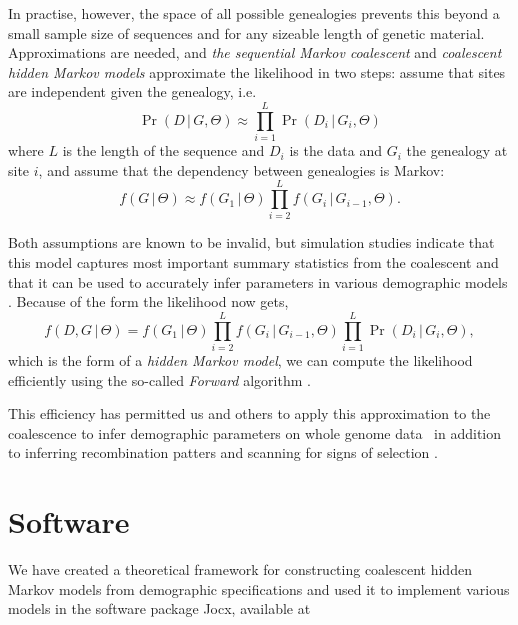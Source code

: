 \documentclass[graybox]{svmult}
\begin{document}
In practise, however, the space of all possible genealogies prevents this beyond a small sample size of sequences and for any sizeable length of genetic material. Approximations are needed, and \emph{the sequential Markov coalescent} and \emph{coalescent hidden Markov models} approximate the likelihood in two steps: assume that sites are independent given the genealogy, i.e.
\begin{equation}
  \Pr(D\,|\,G,\Theta) \approx
  \prod_{i=1}^L \Pr(D_i\,|\,G_i,\Theta)
\end{equation}
where $L$ is the length of the sequence and $D_i$ is the data and $G_i$ the genealogy at site $i$, and assume that the dependency between genealogies is Markov:
\begin{equation}
  \label{eq:markov-genealogy}
  f(G\,|\,\Theta) \approx
  f(G_1\,|\,\Theta)\prod_{i=2}^{L}f(G_{i}\,|\,G_{i-1},\Theta)
  .
\end{equation}

Both assumptions are known to be invalid, but simulation studies indicate that this model captures most important summary statistics from the coalescent \cite{McVean:2005hoa,Marjoram:2006hpa} and that it can be used to accurately infer parameters in various demographic models \cite{Mailund:2011dva,Mailund:2012ewa,Cheng:2015kia}. Because of the form the likelihood now gets,
\begin{equation}
  \label{eq:coalhmm-joint-probability}
  f(D,G\,|\,\Theta) =
  	f(G_1\,|\,\Theta)
  	\prod_{i=2}^{L}f(G_{i}\,|\,G_{i-1},\Theta)
  	\prod_{i=1}^L \Pr(D_i\,|\,G_i,\Theta)
  	,
\end{equation}
which is the form of a \emph{hidden Markov model}, we can compute the likelihood efficiently using the so-called \emph{Forward} algorithm \cite[chapter 3]{durbin1998biological}.


This efficiency has permitted us and others to apply this approximation to the coalescence to infer demographic parameters on whole genome data~\cite{Li:2011eza,Locke:2011gna, Hobolth:2011dia, Scally:2012ika, Prufer:2012ea, Miller:2012cxa, Abascal:2016cy, PradoMartinez:2013dna, Jonsson:2014fga} in addition to inferring recombination patters \cite{Munch:2014cba,Munch:2014cwa} and scanning for signs of selection \cite{Dutheil:2015kl,Munch:2016dn}.

\section{Software}

We have created a theoretical framework for constructing coalescent hidden Markov models from demographic specifications \cite{Mailund:2011dva,Mailund:2012ewa,Mailund2012,Cheng:2015kia} and used it to implement various models in the software package Jocx, available at
\end{document}
